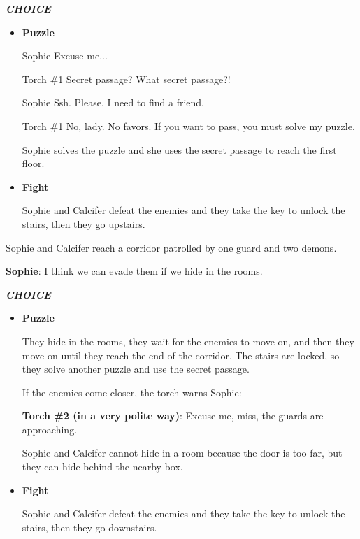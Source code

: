 \textit{\textbf{CHOICE}}
\begin{itemize}
  \item \textbf{Puzzle}
  
\begin{screenplay}

\begin{dialogue}{Sophie}
Excuse me...
\end{dialogue}

\begin{dialogue}{Torch \#{}1}
Secret passage? What secret passage?!
\end{dialogue}

\begin{dialogue}{Sophie}
Ssh. Please, I need to find a friend.
\end{dialogue}

\begin{dialogue}[determined]{Torch \#{}1}
No, lady. No favors. If you want to pass, you must solve my puzzle.
\end{dialogue}

\end{screenplay}
\vspace{1em}

    Sophie solves the puzzle and she uses the secret passage to reach the first floor.

  \item \textbf{Fight}
  
  Sophie and Calcifer defeat the enemies and they take the key to unlock the stairs, then they go upstairs.
\end{itemize}


Sophie and Calcifer reach a corridor patrolled by one guard and two demons.

\textbf{Sophie}: I think we can evade them if we hide in the rooms.

\textit{\textbf{CHOICE}}
\begin{itemize}
  \item \textbf{Puzzle}
  
  They hide in the rooms, they wait for the enemies to move on, and then they move on until they reach the end of the corridor. The stairs are locked, so they solve another puzzle and use the secret passage.
  
  If the enemies come closer, the torch warns Sophie:
  
  \textbf{Torch \#{}2 (in a very polite way)}: Excuse me, miss, the guards are approaching.
  
  Sophie and Calcifer cannot hide in a room because the door is too far, but they can hide behind the nearby box.

  \item \textbf{Fight}
  
  Sophie and Calcifer defeat the enemies and they take the key to unlock the stairs, then they go downstairs.
\end{itemize}

